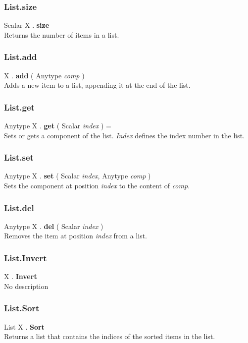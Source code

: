 \documentclass[10pt]{book}
\newcommand{\var}[1]{\textit{#1}}
\begin{document}
\subsubsection{List.size \label{F:List:size}}
Scalar X . \textbf{size} \\
Returns the number of items in a list.

\subsubsection{List.add \label{F:List:add}}
X . \textbf{add} ( Anytype \textit{comp} ) \\
Adds a new item to a list, appending it at the end of the list.

\subsubsection{List.get \label{F:List:get}}
Anytype X . \textbf{get} ( Scalar \textit{index} ) = \\
Sets or gets a component of the list. \var{Index} defines the index number in the list.

\subsubsection{List.set \label{F:List:set}}
Anytype X . \textbf{set} ( Scalar \textit{index}, Anytype \textit{comp} ) \\
Sets the component at position \var{index} to the content of \var{comp}.

\subsubsection{List.del \label{F:List:del}}
Anytype X . \textbf{del} ( Scalar \textit{index} ) \\
Removes the item at position \var{index} from a list.

\subsubsection{List.Invert \label{F:List:Invert}}
X . \textbf{Invert} \\
No description

\subsubsection{List.Sort \label{F:List:Sort}}
List X . \textbf{Sort} \\
Returns a list that contains the indices of the sorted items in the list.
\end{document}

